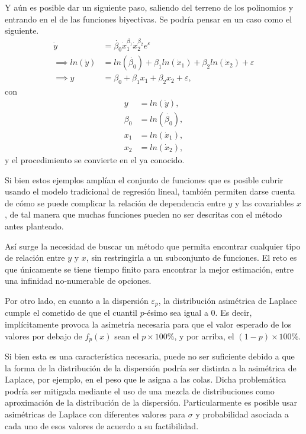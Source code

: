 Y a\'un es posible dar un siguiente paso, saliendo del terreno de los polinomios y entrando en el de las funciones biyectivas. Se podr\'ia pensar en un caso como el siguiente.
\begin{equation*}
\begin{aligned}
    \dot{y} &= \dot{\beta_0}\dot{x}_1^{\beta_1}\dot{x}_2^{\beta_2} e^{\varepsilon} \\
    \implies ln(\dot{y}) &= ln(\dot{\beta_0}) + \beta_1 ln(\dot{x}_1) + \beta_2 ln(\dot{x}_2) + \varepsilon \\
    \implies y &= \beta_0 + \beta_1 x_1 + \beta_2 x_2 + \varepsilon, 
\end{aligned}
\end{equation*}
con
\begin{equation*}
\begin{aligned}
    y &= ln(\dot{y}), \\
    \beta_0 &= ln(\dot{\beta_0}), \\
    x_1 &= ln(\dot{x}_1), \\
    x_2 &= ln(\dot{x}_2),
\end{aligned}
\end{equation*}
y el procedimiento se convierte en el ya conocido.

Si bien estos ejemplos ampl\'ian el conjunto de funciones que es posible cubrir usando el modelo tradicional de regresi\'on lineal, tambi\'en permiten darse cuenta de c\'omo se puede complicar la relaci\'on de dependencia entre $y$ y las covariables $x$, de tal manera que muchas funciones pueden no ser descritas con el m\'etodo antes planteado.

As\'i surge la necesidad de buscar un m\'etodo que permita encontrar cualquier tipo de relaci\'on entre $y$ y $x$, sin restringirla a un subconjunto de funciones. El reto es que \'unicamente se tiene tiempo finito para encontrar la mejor estimaci\'on, entre una infinidad no-numerable de opciones.

Por otro lado, en cuanto a la dispersi\'on $\varepsilon_p$, la distribuci\'on asim\'etrica de Laplace cumple el cometido de que el cuantil $p$-\'esimo sea igual a 0. Es decir, impl\'icitamente provoca la asimetr\'ia necesaria para que el valor esperado de los valores por debajo de $f_p(x)$ sean el $p \times 100\%$, y por arriba, el $(1-p) \times 100\%$.

Si bien esta es una caracter\'istica necesaria, puede no ser suficiente debido a que la forma de la distribuci\'on de la dispersi\'on podr\'ia ser distinta a la asim\'etrica de Laplace, por ejemplo, en el peso que le asigna a las colas. Dicha problem\'atica podr\'ia ser mitigada mediante el uso de una mezcla de distribuciones como aproximaci\'on de la distribuci\'on de la dispersi\'on.  Particularmente es posible usar asim\'etricas de Laplace con diferentes valores para $\sigma$ y probabilidad asociada a cada uno de esos valores de acuerdo a su factibilidad. 

